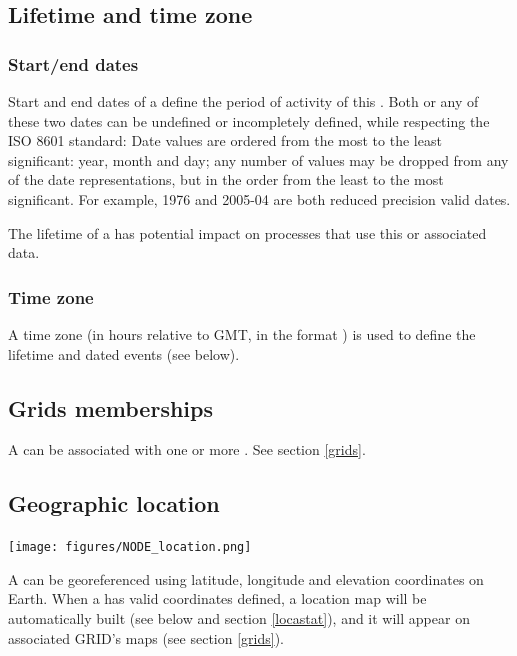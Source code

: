 \subsection{Lifetime and time zone}

\subsubsection{Start/end dates}

Start and end dates of a  define the period of activity of this . Both or any of these two dates can be undefined or incompletely defined, while respecting the ISO 8601 standard: Date values are ordered from the most to the least significant: year, month and day; any number of values may be dropped from any of the date representations, but in the order from the least to the most significant. For example, 1976 and 2005-04 are both reduced precision valid dates.

The lifetime of a  has potential impact on processes that use this  or associated data.


\subsubsection{Time zone}

A time zone (in hours relative to GMT, in the format ) is used to define the lifetime and dated events (see below).

\subsection{Grids memberships}

A  can be associated with one or more . See section \ref{grids}.

\subsection{Geographic location}

\texttt{[image: figures/NODE\_location.png]}

A  can be georeferenced using latitude, longitude and elevation coordinates on Earth. When a  has valid coordinates defined, a location map will be automatically built (see below and section \ref{locastat}), and it will appear on associated GRID's maps (see section \ref{grids}).

